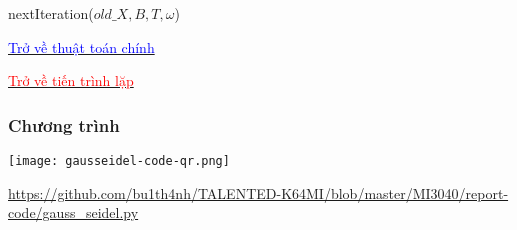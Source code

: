     \begin{frame}[fragile, label = gauss_seidel.next_iteration]
        \IncMargin{1em}\begin{function}[H]
            \caption{nextIteration($old\_X, B, T, \omega$)}
        \end{function}\DecMargin{1em}

        \hyperlink{gauss_seidel.algo}{\textcolor{blue}{Trở về thuật toán chính}}

        \hyperlink{gauss_seidel.iterate}{\textcolor{red}{Trở về tiến trình lặp}}
    \end{frame}



    \begin{frame}[label = gauss_seidel.code]
        \frametitle{Chương trình}
        \begin{center}
            \texttt{[image: gausseidel-code-qr.png]}

            \url{https://github.com/bu1th4nh/TALENTED-K64MI/blob/master/MI3040/report-code/gauss_seidel.py}
        \end{center}
        
    
    \end{frame}

